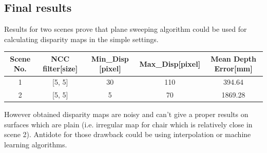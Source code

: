 \subsection*{Final results}
Results for two scenes prove that plane sweeping algorithm could be used for calculating disparity maps in the simple settings.
\begin{center}
 \begin{tabular}{||c c c c c||} 
 \hline
 Scene No. & NCC filter[size] & Min\_Disp [pixel] & Max\_Disp[pixel] & Mean Depth Error[mm] \\ [0.5ex] 
 \hline\hline
 1 & [5, 5] & 30 & 110 & 394.64\\ 
 \hline
 2 & [5, 5] & 5 & 70 & 1869.28\\  [1ex] 
 \hline
\end{tabular}
\end{center}
However obtained disparity maps are noisy and can't give a proper results on surfaces which are plain (i.e. irregular map for chair which is relatively close in scene 2). Antidote for those drawback could be using interpolation or machine learning algorithms.
\medskip 
 \begin{figure}[H]
\printbibliography
\end{figure}

